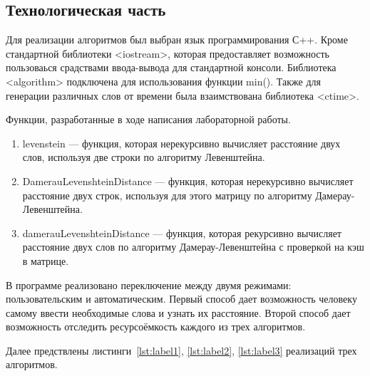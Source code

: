 \documentclass[12pt, a4paper]{article}
\begin{document}
\newpage
\begin{center}
    \section{Технологическая часть}
\end{center}

Для реализации алгоритмов был выбран язык программирования С++. Кроме стандартной библиотеки <iostream>, которая предоставляет возможность пользоваься срадствами ввода-вывода для стандартной консоли. Библиотека <algorithm> подключена для использования функции min(). Также для генерации различных слов от времени была взаимствована библиотека <ctime>.
\par Функции, разработанные в ходе написания лабораторной работы. 
\begin{enumerate}
\item levenstein --- функция, которая нерекурсивно вычисляет расстояние двух слов, используя две строки по алгоритму Левенштейна.
    \item DamerauLevenshteinDistance --- функция, которая нерекурсивно вычисляет расстояние двух строк, используя для этого матрицу по алгоритму Дамерау-Левенштейна.
    \item damerauLevenshteinDistance --- функция, которая рекурсивно вычисляет расстояние двух слов по алгоритму Дамерау-Левенштейна с проверкой на кэш в матрице. 
\end{enumerate}

В программе реализовано переключение между двумя режимами: пользовательским и автоматическим. Первый способ дает возможность человеку самому ввести необходимые слова и узнать их расстояние. Второй способ дает возможность отследить ресурсоёмкость каждого из трех алгоритмов.
\par Далее предствлены листинги~\ref{lst:label1}, \ref{lst:label2}, \ref{lst:label3} реализаций трех алгоритмов.
\end{document}
